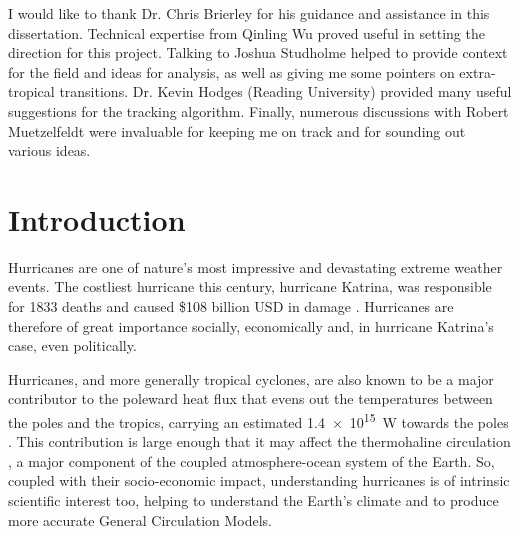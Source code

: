 \documentclass[pdftex,12pt,a4paper]{report}
\begin{document}
I would like to thank Dr. Chris Brierley for his guidance and assistance in this dissertation.
Technical expertise from Qinling Wu proved useful in setting the direction for this project.
Talking to Joshua Studholme helped to provide context for the field and ideas for analysis, as well
as giving me some pointers on extra-tropical transitions. %
Dr. Kevin Hodges (Reading University) provided many useful suggestions for the tracking algorithm.
Finally, numerous discussions with Robert Muetzelfeldt were invaluable for keeping me on track and
for sounding out various ideas.

\newpage

\tableofcontents

\chapter{Introduction}


Hurricanes are one of nature's most impressive and devastating extreme weather events. The costliest
hurricane this century, hurricane Katrina, was responsible for 1833 deaths and caused \$108
billion USD in damage \parencite{TODOCITE}. %
Hurricanes are therefore of great importance socially,
economically and, in hurricane Katrina's case, even politically.

Hurricanes, and more generally tropical cyclones, are also known to be a major contributor to the
poleward heat flux that evens out the temperatures between the poles and the tropics, carrying an
estimated \SI{1.4e15}{W} towards the poles \parencite{emanuelContribution2012}. This
contribution is large enough that it may affect the thermohaline circulation
\parencite{huEffect2009}, a major component of the coupled atmosphere-ocean system of the Earth. So,
coupled with their socio-economic impact, understanding hurricanes is of intrinsic scientific
interest too, helping to understand the Earth's climate and to produce more accurate General
Circulation Models.
\end{document}
